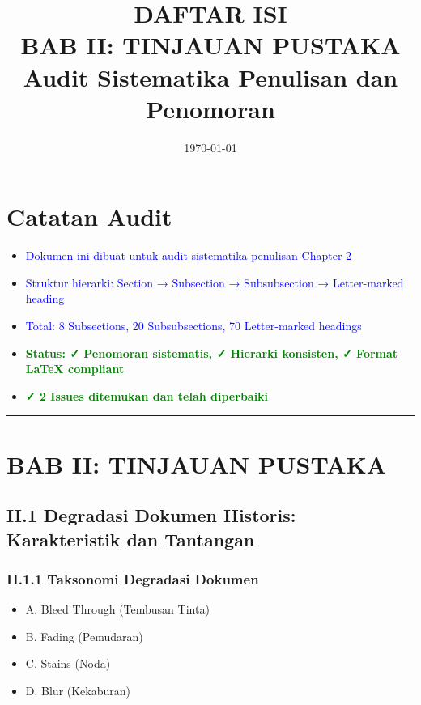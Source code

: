 \documentclass[11pt,a4paper]{article}
\title{\textbf{DAFTAR ISI\\BAB II: TINJAUAN PUSTAKA\\[0.5em]{\large Audit Sistematika Penulisan dan Penomoran}}}
\author{}
\date{\today}
\begin{document}
\maketitle

\section*{Catatan Audit}
\begin{itemize}[leftmargin=*]
    \item \textcolor{blue}{Dokumen ini dibuat untuk audit sistematika penulisan Chapter 2}
    \item \textcolor{blue}{Struktur hierarki: Section → Subsection → Subsubsection → Letter-marked heading}
    \item \textcolor{blue}{Total: 8 Subsections, 20 Subsubsections, 70 Letter-marked headings}
    \item \textcolor{green}{\textbf{Status: ✓ Penomoran sistematis, ✓ Hierarki konsisten, ✓ Format LaTeX compliant}}
    \item \textcolor{green}{\textbf{✓ 2 Issues ditemukan dan telah diperbaiki}}
\end{itemize}

\vspace{1em}
\hrule
\vspace{1.5em}


\section*{BAB II: TINJAUAN PUSTAKA}

\subsection*{II.1 Degradasi Dokumen Historis: Karakteristik dan Tantangan}

\subsubsection*{II.1.1 Taksonomi Degradasi Dokumen}
\begin{itemize}[label={}, leftmargin=2em]
    \item A. Bleed Through (Tembusan Tinta)
    \item B. Fading (Pemudaran)
    \item C. Stains (Noda)
    \item D. Blur (Kekaburan)
\end{itemize}
\end{document}
